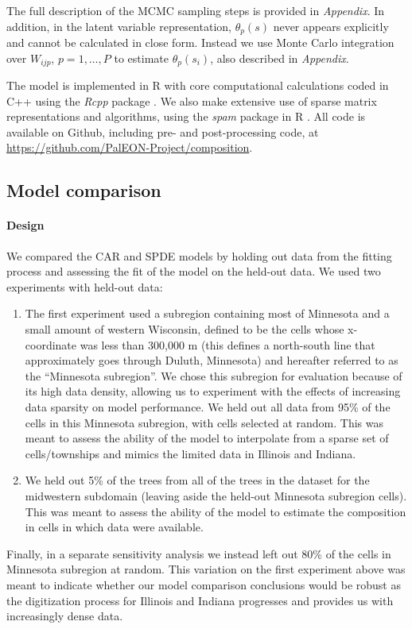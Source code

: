 \documentclass[10pt,letterpaper]{article}
\begin{document}
The full description of the MCMC sampling steps is provided in \emph{Appendix}. In addition, in the latent variable representation, $\theta_{p}(s)$
never appears explicitly and cannot be calculated in close form. Instead
we use Monte Carlo integration over $W_{ijp},\, p=1,\ldots,P$ to
estimate $\theta_{p}(s_{i})$, also described in \emph{Appendix}. 

The model is implemented in R \cite{R:2014} with core computational
calculations coded in C++ using the \emph{Rcpp} package \cite{Edde:Fran:2011}.
We also make extensive use of sparse matrix representations and algorithms,
using the \emph{spam} package in R \cite{Furr:Sain:2010}. All code
is available on Github, including pre- and post-processing code, at
\href{https://github.com/PalEON-Project/composition}{https://github.com/PalEON-Project/composition}. 



\subsection*{Model comparison\label{sec:Model-comparison}}


\paragraph*{Design}

We compared the CAR and SPDE models by holding out
data from the fitting process and assessing the fit of the model
on the held-out data. We used two experiments with
held-out data:
\begin{enumerate}
\item The first experiment used a subregion containing most of Minnesota
and a small amount of western Wisconsin, defined to be the cells whose
x-coordinate was less than 300,000 m (this defines a north-south line
that approximately goes through Duluth, Minnesota) and hereafter referred
to as the ``Minnesota subregion''. We chose this subregion for evaluation
because of its high data density, allowing us to experiment with the
effects of increasing data sparsity on model performance. We held
out all data from 95\% of the cells in this Minnesota subregion, with
cells selected at random. This was meant to assess the ability of
the model to interpolate from a sparse set of cells/townships and
mimics the limited data in Illinois and Indiana.
\item We held out 5\% of the trees from all of the trees in the dataset
for the midwestern subdomain (leaving aside the held-out Minnesota
subregion cells). This was meant to assess the ability of the model
to estimate the composition in cells in which data were available. 
\end{enumerate}
Finally, in a separate sensitivity analysis we instead left out 80\%
of the cells in Minnesota subregion at random. This variation on the
first experiment above was meant to indicate whether our model comparison
conclusions would be robust as the digitization process for Illinois
and Indiana progresses and provides us with increasingly dense data. 
\end{document}
